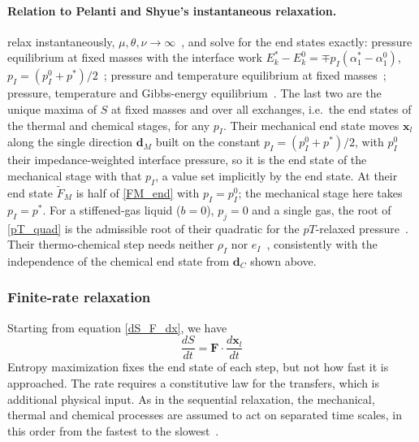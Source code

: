 \paragraph{Relation to Pelanti and Shyue's instantaneous relaxation.}
\cite{PelantiShyue2014} relax instantaneously, $\mu,\theta,\nu\to\infty$~\cite[eqs.~(34), (41), (44)]{PelantiShyue2014}, and solve for the end states exactly: pressure equilibrium at fixed masses with the interface work $E_k^*-E_k^0=\mp p_I(\alpha_1^*-\alpha_1^0)$, $p_I=(p_I^0+p^*)/2$~\cite[eqs.~(37), (38)]{PelantiShyue2014}; pressure and temperature equilibrium at fixed masses~\cite[eqs.~(42), (43)]{PelantiShyue2014}; pressure, temperature and Gibbs-energy equilibrium~\cite[eqs.~(46), (47)]{PelantiShyue2014}. The last two are the unique maxima of $S$ at fixed masses and over all exchanges, i.e.\ the end states of the thermal and chemical stages, for any $p_I$. Their mechanical end state moves $\boldsymbol{x}_l$ along the single direction $\boldsymbol{d}_M$ built on the constant $p_I=(p_I^0+p^*)/2$, with $p_I^0$ their impedance-weighted interface pressure, so it is the end state of the mechanical stage with that $p_I$, a value set implicitly by the end state. At their end state $\tilde{F}_M$ is half of \eqref{FM_end} with $p_I=p_I^0$; the mechanical stage here takes $p_I=p^*$. For a stiffened-gas liquid ($b=0$), $p_{j}=0$ and a single gas, the root of \eqref{pT_quad} is the admissible root of their quadratic for the $pT$-relaxed pressure~\cite[eqs.~(C.3)--(C.5)]{PelantiShyue2014}. Their thermo-chemical step needs neither $\rho_I$ nor $e_I$~\cite[eq.~(44)]{PelantiShyue2014}, consistently with the independence of the chemical end state from $\boldsymbol{d}_C$ shown above.

\subsubsection{Finite-rate relaxation}
Starting from equation \eqref{dS_F_dx}, we have
\begin{equation}\label{dSdt}
\frac{dS}{dt} = \boldsymbol{F} \cdot \frac{d\boldsymbol{x}_l}{dt}
\end{equation}
Entropy maximization fixes the end state of each step, but not how fast it is approached. The rate requires a constitutive law for the transfers, which is additional physical input. As in the sequential relaxation, the mechanical, thermal and chemical processes are assumed to act on separated time scales, in this order from the fastest to the slowest~\cite[Sec.~5]{Pelanti2022}.

